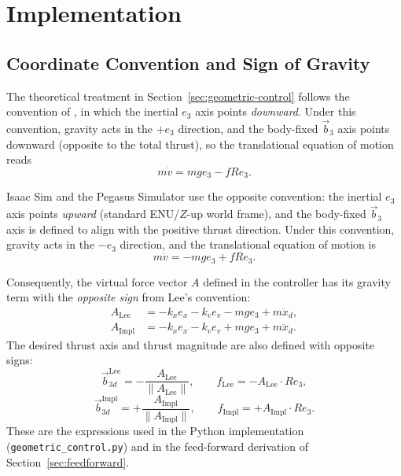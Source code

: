 \documentclass[11pt]{article}
\theoremstyle{remark}
\begin{document}
\section{Implementation}
\label{sec:implementation}

\subsection{Coordinate Convention and Sign of Gravity}
\label{sec:convention}
The theoretical treatment in Section~\ref{sec:geometric-control} follows the convention of \cite{Lee2010CDC}, in which the inertial $e_3$ axis points \emph{downward}. Under this convention, gravity acts in the $+e_3$ direction, and the body-fixed $\vec{b}_3$ axis points downward (opposite to the total thrust), so the translational equation of motion reads
\begin{equation}
    m\dot v = mg e_3 - f R e_3. \tag{Lee}\label{eq:vdot-lee}
\end{equation}

Isaac Sim and the Pegasus Simulator use the opposite convention: the inertial $e_3$ axis points \emph{upward} (standard ENU/$Z$-up world frame), and the body-fixed $\vec{b}_3$ axis is defined to align with the positive thrust direction. Under this convention, gravity acts in the $-e_3$ direction, and the translational equation of motion is
\begin{equation}
    m\dot v = -mg e_3 + f R e_3. \tag{Impl}\label{eq:vdot-impl}
\end{equation}

Consequently, the virtual force vector $A$ defined in the controller has its gravity term with the \emph{opposite sign} from Lee's convention:
\begin{align}
A_{\text{Lee}}  &= -k_x e_x - k_v e_v - m g e_3 + m \ddot x_d, \label{eq:A-lee}\\
A_{\text{Impl}} &= -k_x e_x - k_v e_v + m g e_3 + m \ddot x_d. \label{eq:A-impl}
\end{align}
The desired thrust axis and thrust magnitude are also defined with opposite signs:
\[
\vec{b}_{3d}^{\text{Lee}}  = -\frac{A_{\text{Lee}}}{\|A_{\text{Lee}}\|},\qquad f_{\text{Lee}} = -A_{\text{Lee}} \cdot R e_3,
\]
\[
\vec{b}_{3d}^{\text{Impl}} = +\frac{A_{\text{Impl}}}{\|A_{\text{Impl}}\|},\qquad f_{\text{Impl}} = +A_{\text{Impl}} \cdot R e_3.
\]
These are the expressions used in the Python implementation (\texttt{geometric\_control.py}) and in the feed-forward derivation of Section~\ref{sec:feedforward}.
\end{document}
